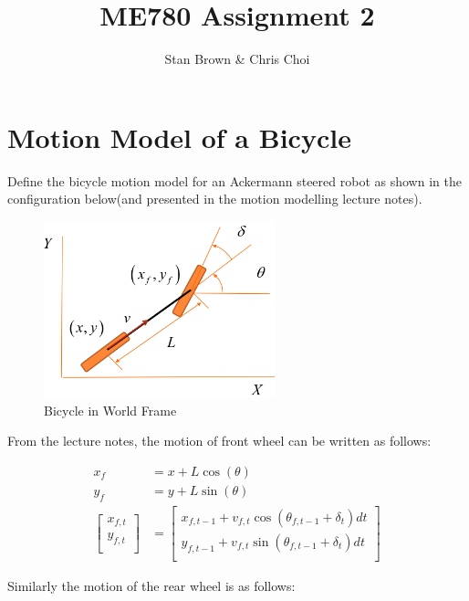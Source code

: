 \documentclass{article}
\begin{document}
\title{ME780 Assignment 2}
\author{Stan Brown \& Chris Choi}
\date{}
\maketitle

\section{Motion Model of a Bicycle}
Define the bicycle motion model for an Ackermann steered robot as shown in the configuration below(and presented in the motion modelling lecture notes). 
\begin{figure}[H]
	\centering
	\includegraphics[width=0.6\textwidth]{images/bicycle_model.png}
	\caption{Bicycle in World Frame}
	\label{fig:bicycle}
\end{figure}

From the lecture notes, the motion of front wheel can be written as follows:

\begin{align}
	x_{f} &= x + L \cos(\theta) \\
	y_{f} &= y + L \sin(\theta) \\
 	\begin{bmatrix}
        x_{f, t} \\
        y_{f, t} \\
    \end{bmatrix}  
    &=
    \begin{bmatrix}
	    x_{f, t - 1} + v_{f, t} \cos(\theta_{f, t - 1} + \delta_{t}) dt \\
		y_{f, t - 1} + v_{f, t} \sin(\theta_{f, t - 1} + \delta_{t}) dt \\
    \end{bmatrix}
\end{align}

Similarly the motion of the rear wheel is as follows: 
\end{document}

